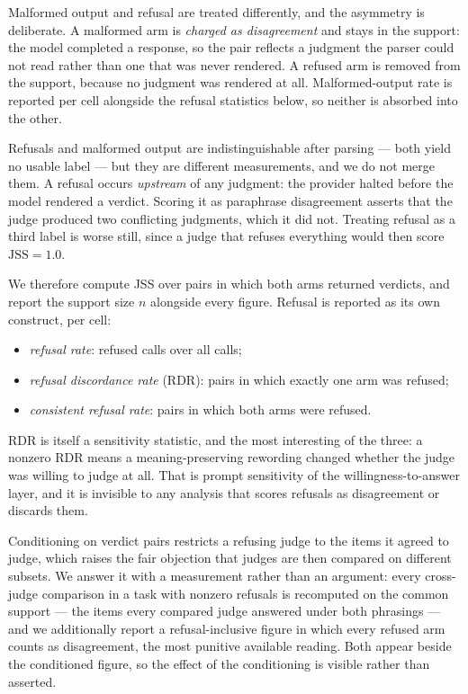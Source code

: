 Malformed output and refusal are treated differently, and the asymmetry is
deliberate. A malformed arm is \emph{charged as disagreement} and stays in the
support: the model completed a response, so the pair reflects a judgment the
parser could not read rather than one that was never rendered. A refused arm is
removed from the support, because no judgment was rendered at all. Malformed-output
rate is reported per cell alongside the refusal statistics below, so neither is
absorbed into the other.

Refusals and malformed output are indistinguishable after parsing --- both yield
no usable label --- but they are different measurements, and we do not merge
them. A refusal occurs \emph{upstream} of any judgment: the provider halted
before the model rendered a verdict. Scoring it as paraphrase disagreement
asserts that the judge produced two conflicting judgments, which it did not.
Treating refusal as a third label is worse still, since a judge that refuses
everything would then score $\mathrm{JSS} = 1.0$.

We therefore compute JSS over pairs in which both arms returned verdicts, and
report the support size $n$ alongside every figure. Refusal is reported as its
own construct, per cell:

\begin{itemize}
  \item \emph{refusal rate}: refused calls over all calls;
  \item \emph{refusal discordance rate} (RDR): pairs in which exactly one arm was
    refused;
  \item \emph{consistent refusal rate}: pairs in which both arms were refused.
\end{itemize}

RDR is itself a sensitivity statistic, and the most interesting of the three: a
nonzero RDR means a meaning-preserving rewording changed whether the judge was
willing to judge at all. That is prompt sensitivity of the willingness-to-answer
layer, and it is invisible to any analysis that scores refusals as disagreement
or discards them.

Conditioning on verdict pairs restricts a refusing judge to the items it agreed
to judge, which raises the fair objection that judges are then compared on
different subsets. We answer it with a measurement rather than an argument: every
cross-judge comparison in a task with nonzero refusals is recomputed on the
common support --- the items every compared judge answered under both phrasings
--- and we additionally report a refusal-inclusive figure in which every refused
arm counts as disagreement, the most punitive available reading. Both appear
beside the conditioned figure, so the effect of the conditioning is visible
rather than asserted.

